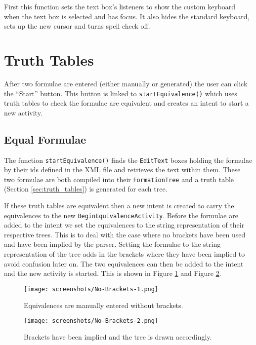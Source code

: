 \documentclass{report}
\begin{document}
First this function sets the text box's listeners to show the custom keyboard when the text box is selected and has focus. It also hides the standard keyboard, sets up the new cursor and turns spell check off.

\section{Truth Tables}
\label{sec:app_truth_tables}

After two formulae are entered (either manually or generated) the user can click the ``Start'' button. This button is linked to {\tt startEquivalence()} which uses truth tables to check the formulae are equivalent and creates an intent to start a new activity.

\subsection{Equal Formulae}
\label{sub:equal_equivalences}

The function {\tt startEquivalence()} finds the {\tt EditText} boxes holding the formulae by their ids defined in the XML file and retrieves the text within them. These two formulae are both compiled into their {\tt FormationTree} and a truth table (Section \ref{sec:truth_tables}) is generated for each tree. 

If these truth tables are equivalent then a new intent is created to carry the equivalences to the new {\tt BeginEquivalenceActivity}. Before the formulae are added to the intent we set the equivalences to the string representation of their respective trees. This is to deal with the case where no brackets have been used and have been implied by the parser. Setting the formulae to the string representation of the tree adds in the brackets where they have been implied to avoid confusion later on. The two equivalences can then be added to the intent and the new activity is started. This is shown in Figure \ref{nobrackets1} and Figure \ref{nobrackets2}.

\begin{figure}[ht!]
    \centering
    \texttt{[image: screenshots/No-Brackets-1.png]}
    \caption{Equivalences are manually entered without brackets.}
    \label{nobrackets1}
\end{figure}

\begin{figure}[ht!]
    \centering
    \texttt{[image: screenshots/No-Brackets-2.png]}
    \caption{Brackets have been implied and the tree is drawn accordingly.}
    \label{nobrackets2}
\end{figure}
\end{document}
